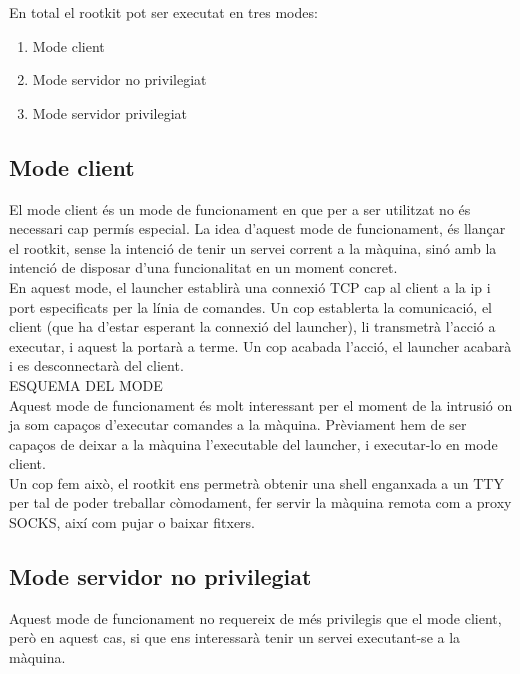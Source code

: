 En total el rootkit pot ser executat en tres modes: 

\begin{enumerate}
    \item Mode client
    \item Mode servidor no privilegiat
    \item Mode servidor privilegiat
\end{enumerate}

\subsection{Mode client} 

El mode client és un mode de funcionament en que per a ser utilitzat no és necessari cap permís especial. 
La idea d'aquest mode de funcionament, és llançar el rootkit, sense la intenció de tenir un servei corrent
a la màquina, sinó amb la intenció de disposar d'una funcionalitat en un moment concret. \\

En aquest mode, el launcher establirà una connexió TCP cap al client a la ip i port especificats per la línia
de comandes. Un cop establerta la comunicació, el client (que ha d'estar esperant la connexió del launcher), 
li transmetrà l'acció a executar, i aquest la portarà a terme. Un cop acabada l'acció, el launcher acabarà
i es desconnectarà del client. \\

ESQUEMA DEL MODE \\

Aquest mode de funcionament és molt interessant per el moment de la intrusió on ja som capaços d'executar
comandes a la màquina. Prèviament hem de ser capaços de deixar a la màquina l'executable del launcher, i
executar-lo en mode client. \\

Un cop fem això, el rootkit ens permetrà obtenir una shell enganxada a un TTY per tal de poder treballar 
còmodament, fer servir la màquina remota com a proxy SOCKS, així com pujar o baixar fitxers. \\

\subsection{Mode servidor no privilegiat}

Aquest mode de funcionament no requereix de més privilegis que el mode client, però en aquest cas, si que
ens interessarà tenir un servei executant-se a la màquina. \\

